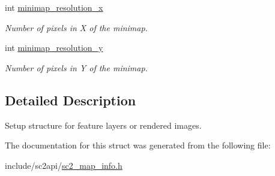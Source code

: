 \begin{DoxyCompactItemize}
int \hyperlink{structsc2_1_1_spatial_setup_aab77c57499ded735dfd268f710ae31b1}{minimap\+\_\+resolution\+\_\+x}
\begin{DoxyCompactList}\small\item\em Number of pixels in X of the minimap. \end{DoxyCompactList}\item 
\mbox{\label{structsc2_1_1_spatial_setup_a930f3747e2f0a32e72220cd4a4ae90fd}} 
int \hyperlink{structsc2_1_1_spatial_setup_a930f3747e2f0a32e72220cd4a4ae90fd}{minimap\+\_\+resolution\+\_\+y}
\begin{DoxyCompactList}\small\item\em Number of pixels in Y of the minimap. \end{DoxyCompactList}\end{DoxyCompactItemize}


\subsection{Detailed Description}
Setup structure for feature layers or rendered images. 

The documentation for this struct was generated from the following file\+:\begin{DoxyCompactItemize}
\item 
include/sc2api/\hyperlink{sc2__map__info_8h}{sc2\+\_\+map\+\_\+info.\+h}\end{DoxyCompactItemize}
